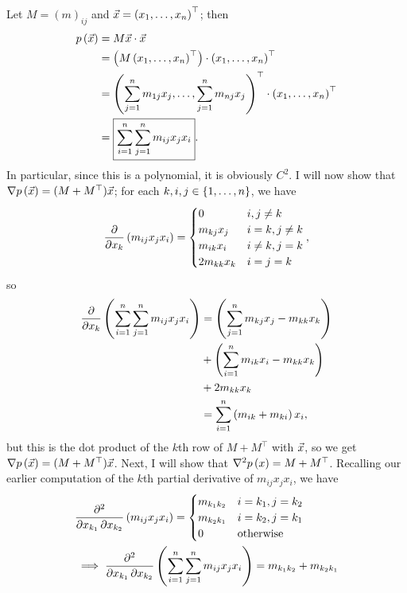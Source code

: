 \documentclass[main.tex]{subfiles}
\begin{document}
\begin{soln}
    Let $M = (m)_{ij}$ and $\vec{x} = \left( x_1, \ldots , x_n \right)^\top$; then
    \begin{align*}
        p\left( \vec{x} \right) &= M\vec{x}\cdot \vec{x} \\
        &= \left( M\left( x_1, \ldots , x_n \right)^\top \right) \cdot \left( x_1, \ldots , x_n \right)^\top \\
        &= \left( \sum_{j = 1}^n m_{1j}x_{j}, \ldots , \sum_{j = 1}^n m_{nj}x_{j} \right)^\top \cdot \left( x_1, \ldots , x_n \right)^\top \\
        &= \boxed{\sum_{i = 1}^n\sum_{j = 1}^n m_{ij}x_jx_i}.
    \end{align*}
    In particular, since this is a polynomial, it is obviously $C^2$. I will now show that $\nabla p\left( \vec{x} \right) = (M + M^\top)\vec{x}$; for each $k, i, j \in \left\{ 1, \ldots , n \right\}$, we have
    \[\pdv{}{x_k}\left( m_{ij}x_jx_i \right) =
    \begin{cases}
        0 & i, j \neq k \\
        m_{kj}x_j & i = k, j \neq k \\
        m_{ik}x_i & i \neq k, j = k \\
        2m_{kk} x_k & i = j = k
    \end{cases},\]
    so
    \begin{align*}
        \pdv{}{x_k}\left( \sum_{i = 1}^n\sum_{j = 1}^n m_{ij}x_jx_i \right) &= \left( \sum_{j = 1}^n m_{kj}x_j - m_{kk}x_k \right) \\
        &+ \left( \sum_{i = 1}^n m_{ik}x_i - m_{kk}x_k \right) \\
        &+ 2m_{kk}x_k \\
        &= \sum_{i = 1}^n \left( m_{ik} + m_{ki} \right) x_i,
    \end{align*}
    but this is the dot product of the $k$th row of $M + M^\top$ with $\vec{x}$, so we get $\nabla p\left( \vec{x} \right) = (M + M^\top)\vec{x}$. Next, I will show that $\nabla^2p\left( x \right) = M + M^\top$. Recalling our earlier computation of the $k$th partial derivative of $m_{ij}x_jx_i$, we have
    \begin{align*}
        &\pdv{}{x_{k_1}, x_{k_2}} \parens{m_{ij}x_jx_i} = 
        \begin{cases}
            m_{k_1k_2} & i = k_1, j = k_2 \\
            m_{k_2k_1} & i = k_2, j = k_1 \\
            0 & \text{otherwise}
        \end{cases} \\
        &\implies \pdv{}{x_{k_1}, x_{k_2}}\parens{\sum_{i = 1}^n\sum_{j = 1}^n m_{ij}x_jx_i} = m_{k_1k_2} + m_{k_2k_1} \\

\end{align*}
\end{soln}
\end{document}
